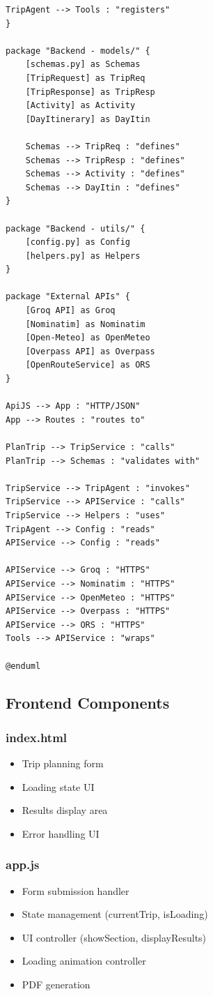 \documentclass[12pt,a4paper]{report}
\begin{document}
{\begin{landscape}
\begin{lstlisting}[style=pythonstyle, caption={Component Architecture - PlantUML Code}, language={}]
    TripAgent --> Tools : "registers"
}

package "Backend - models/" {
    [schemas.py] as Schemas
    [TripRequest] as TripReq
    [TripResponse] as TripResp
    [Activity] as Activity
    [DayItinerary] as DayItin
    
    Schemas --> TripReq : "defines"
    Schemas --> TripResp : "defines"
    Schemas --> Activity : "defines"
    Schemas --> DayItin : "defines"
}

package "Backend - utils/" {
    [config.py] as Config
    [helpers.py] as Helpers
}

package "External APIs" {
    [Groq API] as Groq
    [Nominatim] as Nominatim
    [Open-Meteo] as OpenMeteo
    [Overpass API] as Overpass
    [OpenRouteService] as ORS
}

ApiJS --> App : "HTTP/JSON"
App --> Routes : "routes to"

PlanTrip --> TripService : "calls"
PlanTrip --> Schemas : "validates with"

TripService --> TripAgent : "invokes"
TripService --> APIService : "calls"
TripService --> Helpers : "uses"
TripAgent --> Config : "reads"
APIService --> Config : "reads"

APIService --> Groq : "HTTPS"
APIService --> Nominatim : "HTTPS"
APIService --> OpenMeteo : "HTTPS"
APIService --> Overpass : "HTTPS"
APIService --> ORS : "HTTPS"
Tools --> APIService : "wraps"

@enduml
\end{lstlisting}
\end{landscape}
\clearpage
}

\subsection{Frontend Components}

\subsubsection{index.html}
\begin{itemize}
    \item Trip planning form
    \item Loading state UI
    \item Results display area
    \item Error handling UI
\end{itemize}

\subsubsection{app.js}
\begin{itemize}
    \item Form submission handler
    \item State management (currentTrip, isLoading)
    \item UI controller (showSection, displayResults)
    \item Loading animation controller
    \item PDF generation
\end{itemize}
\end{document}
